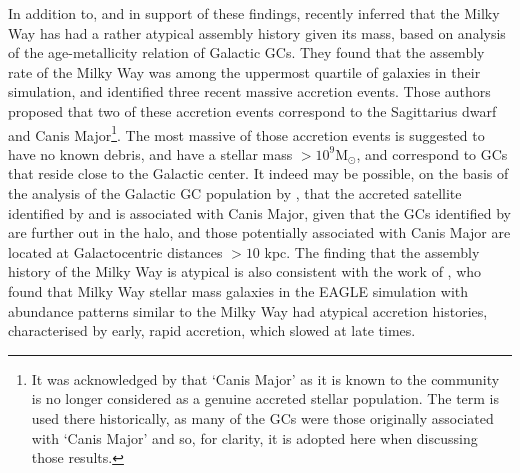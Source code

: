 In addition to, and in support of these findings,
\citet{2018MNRAS.tmp.1537K} recently inferred that the Milky Way
has had a rather atypical assembly history given its mass, based
on analysis of the age-metallicity relation of Galactic GCs. They
found that the assembly rate of the Milky Way was among the uppermost
quartile of galaxies in their simulation, and identified three
recent massive accretion events. Those authors proposed that two of these accretion events correspond to the Sagittarius
dwarf and Canis Major\footnote{It was acknowledged by \citet{2018MNRAS.tmp.1537K} that `Canis Major' as it is known to the community is no longer considered as a genuine accreted stellar population. The term is used there historically, as many of the GCs were those originally associated with `Canis Major' and so, for clarity, it is adopted here when discussing those results.}. The most massive of those
accretion events is suggested to have no known debris, and have a
stellar mass $> 10^9 \mathrm{M_\odot}$, and correspond to GCs that
reside close to the Galactic center.  It indeed may be
possible, on the basis of the analysis of the Galactic GC population
by \citet{2018MNRAS.tmp.1537K}, that the accreted satellite
identified by \citet{2018MNRAS.478..611B} and \citet{2018ApJ...860L..11K} is associated with Canis Major, given that the GCs
identified by \citet{2018arXiv180500453M} are further out in the
halo, and those potentially associated with Canis Major
are located at Galactocentric distances $> 10$ kpc.  The finding
that the assembly history of the Milky Way is atypical is also
consistent with the work of \citet{2018MNRAS.477.5072M}, who found
that Milky Way stellar mass galaxies in the EAGLE simulation with
\afe{} abundance patterns similar to the Milky Way had
atypical accretion histories, characterised by early, rapid
accretion, which slowed at late times.


